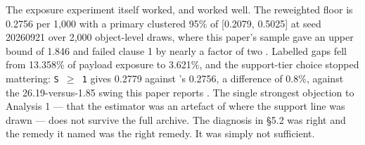 \documentclass[11pt]{article}
\begin{document}

The exposure experiment itself worked, and worked well. The reweighted floor is 0.2756 per 1,000 with a primary clustered 95\% of [0.2079, 0.5025] at seed 20260921 over 2,000 object-level draws, where this paper's sample gave an upper bound of 1.846 and failed clause 1 by nearly a factor of two%
. Labelled gaps fell from 13.358\% of payload exposure to 3.621\%, and the support-tier choice stopped mattering: \texttt{S $\ge$ 1} gives 0.2779 against 's 0.2756, a difference of 0.8\%, against the 26.19-versus-1.85 swing this paper reports%
. The single strongest objection to Analysis 1 --- that the estimator was an artefact of where the support line was drawn --- does not survive the full archive. The diagnosis in \S{}5.2 was right and the remedy it named was the right remedy. It was simply not sufficient.
\end{document}
